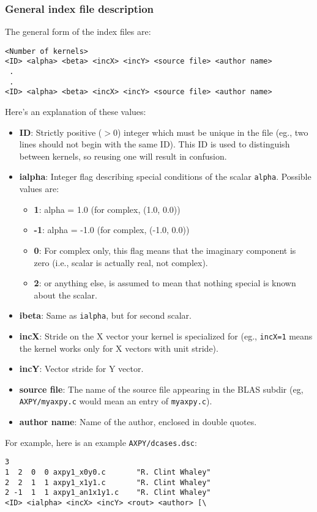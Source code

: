 \documentclass[11pt]{article}
\begin{document}
\subsubsection{General index file description}
The general form of the index files are:
\begin{verbatim}
<Number of kernels>
<ID> <alpha> <beta> <incX> <incY> <source file> <author name>
 .
 .
<ID> <alpha> <beta> <incX> <incY> <source file> <author name>
\end{verbatim}

Here's an explanation of these values:
\begin{itemize}
\item {\bf ID}: Strictly positive ($>0$) integer which must be unique in
the file (eg., two lines should not begin with the same ID).  This ID is
used to distinguish between kernels, so reusing one will result in
confusion.
\item{\bf ialpha}:  Integer flag describing special conditions of the scalar
{\tt alpha}.  Possible values are:
   \begin{itemize}
   \item {\bf 1}: alpha = 1.0 (for complex, (1.0, 0.0))
   \item {\bf -1}: alpha = -1.0 (for complex, (-1.0, 0.0))
   \item {\bf 0}: For complex only, this flag means that the imaginary component
                 is zero (i.e., scalar is actually real, not complex).
   \item {\bf 2}: or anything else, is assumed to mean that nothing special is
      known about the scalar.
\end{itemize}
\item{\bf ibeta}: Same as {\tt ialpha}, but for second scalar.
\item{\bf incX}: Stride on the X vector your kernel is specialized for
                 (eg., {\tt incX=1} means the kernel works only for X vectors
                 with unit stride).
\item{\bf incY}: Vector stride for Y vector.
\item{\bf source file}: The name of the source file appearing in the BLAS
    subdir (eg, {\tt AXPY/myaxpy.c} would mean an entry of {\tt myaxpy.c}).
\item{\bf author name}: Name of the author, enclosed in double quotes.
\end{itemize}

For example, here is an example {\tt AXPY/dcases.dsc}:
\begin{verbatim}
3
1  2  0  0 axpy1_x0y0.c       "R. Clint Whaley"
2  2  1  1 axpy1_x1y1.c       "R. Clint Whaley"
2 -1  1  1 axpy1_an1x1y1.c    "R. Clint Whaley"
<ID> <ialpha> <incX> <incY> <rout> <author> [\
\end{verbatim}
\end{document}
